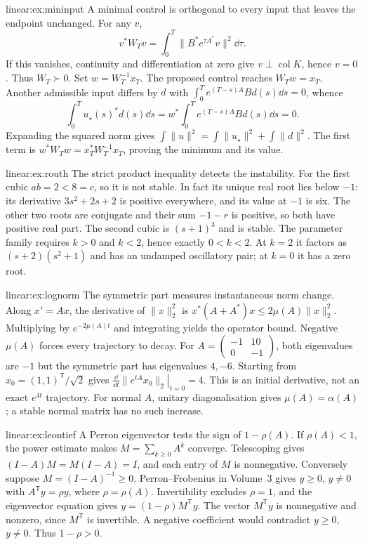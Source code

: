 \begin{solution}{linear:ex:mininput}
\idea A minimal control is orthogonal to every input that leaves the endpoint unchanged.
\writeup For any $v$,
\[v^*W_Tv=\int_0^T\|B^*e^{\tau A^*}v\|^2\dd\tau.
\]
If this vanishes, continuity and differentiation at zero give $v\perp\operatorname{col}K$, hence $v=0$. Thus $W_T\succ0$. Set $w=W_T^{-1}x_T$. The proposed control reaches $W_Tw=x_T$. Another admissible input differs by $d$ with $\int_0^T e^{(T-s)A}Bd(s)\dd s=0$, whence
\[\int_0^T u_\star(s)^*d(s)\dd s=w^*\int_0^T e^{(T-s)A}Bd(s)\dd s=0.
\]
Expanding the squared norm gives $\int\|u\|^2=\int\|u_\star\|^2+\int\|d\|^2$. The first term is $w^*W_Tw=x_T^*W_T^{-1}x_T$, proving the minimum and its value.
\end{solution}
\begin{solution}{linear:ex:routh}
\idea The strict product inequality detects the instability.
\writeup For the first cubic $ab=2<8=c$, so it is not stable. In fact its unique real root lies below $-1$: its derivative $3s^2+2s+2$ is positive everywhere, and its value at $-1$ is six. The other two roots are conjugate and their sum $-1-r$ is positive, so both have positive real part. The second cubic is $(s+1)^3$ and is stable. The parameter family requires $k>0$ and $k<2$, hence exactly $0<k<2$. At $k=2$ it factors as $(s+2)(s^2+1)$ and has an undamped oscillatory pair; at $k=0$ it has a zero root.
\end{solution}
\begin{solution}{linear:ex:lognorm}
\idea The symmetric part measures instantaneous norm change.
\writeup Along $x'=Ax$, the derivative of $\|x\|_2^2$ is $x^*(A+A^*)x\le2\mu(A)\|x\|_2^2$. Multiplying by $e^{-2\mu(A)t}$ and integrating yields the operator bound. Negative $\mu(A)$ forces every trajectory to decay. For $A=\left(\begin{smallmatrix}-1&10\\0&-1\end{smallmatrix}\right)$, both eigenvalues are $-1$ but the symmetric part has eigenvalues $4,-6$. Starting from $x_0=(1,1)^{\mathsf T}/\sqrt2$ gives $\left.\frac{\dd}{\dd t}\|e^{tA}x_0\|_2\right|_{t=0}=4$. This is an initial derivative, not an exact $e^{4t}$ trajectory. For normal $A$, unitary diagonalisation gives $\mu(A)=\alpha(A)$; a stable normal matrix has no such increase.
\end{solution}
\begin{solution}{linear:ex:leontief}
\idea A Perron eigenvector tests the sign of $1-\rho(A)$.
\writeup If $\rho(A)<1$, the power estimate makes $M=\sum_{k\ge0}A^k$ converge. Telescoping gives $(I-A)M=M(I-A)=I$, and each entry of $M$ is nonnegative. Conversely suppose $M=(I-A)^{-1}\ge0$. Perron--Frobenius in Volume~3 gives $y\ge0$, $y\ne0$ with $A^{\mathsf T}y=\rho y$, where $\rho=\rho(A)$. Invertibility excludes $\rho=1$, and the eigenvector equation gives $y=(1-\rho)M^{\mathsf T}y$. The vector $M^{\mathsf T}y$ is nonnegative and nonzero, since $M^{\mathsf T}$ is invertible. A negative coefficient would contradict $y\ge0$, $y\ne0$. Thus $1-\rho>0$.
\end{solution}

